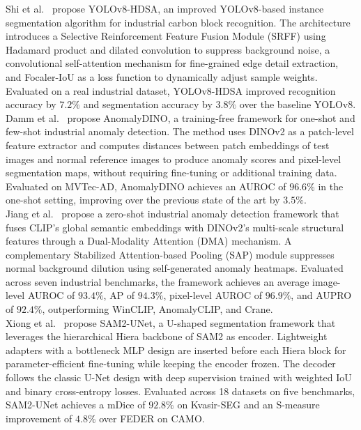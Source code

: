 \documentclass[11pt]{article}
\begin{document}
Shi et al.~\cite{Shi2025CarbonBlock} propose YOLOv8-HDSA, an improved
YOLOv8-based instance segmentation algorithm for industrial carbon block
recognition. The architecture introduces a Selective Reinforcement Feature Fusion
Module (SRFF) using Hadamard product and dilated convolution to suppress
background noise, a convolutional self-attention mechanism for fine-grained edge
detail extraction, and Focaler-IoU as a loss function to dynamically adjust
sample weights. Evaluated on a real industrial dataset, YOLOv8-HDSA improved
recognition accuracy by $7.2\%$ and segmentation accuracy by $3.8\%$ over the
baseline YOLOv8.\\

Damm et al.~\cite{Damm2024AnomalyDINO} propose AnomalyDINO, a training-free
framework for one-shot and few-shot industrial anomaly detection. The method
uses DINOv2 as a patch-level feature extractor and computes distances between
patch embeddings of test images and normal reference images to produce anomaly
scores and pixel-level segmentation maps, without requiring fine-tuning or
additional training data. Evaluated on MVTec-AD, AnomalyDINO achieves an AUROC
of $96.6\%$ in the one-shot setting, improving over the previous state of the
art by $3.5\%$.\\

Jiang et al.~\cite{Jiang2025CLIPDINO} propose a zero-shot industrial anomaly
detection framework that fuses CLIP's global semantic embeddings with DINOv2's
multi-scale structural features through a Dual-Modality Attention (DMA) mechanism.
A complementary Stabilized Attention-based Pooling (SAP) module suppresses normal
background dilution using self-generated anomaly heatmaps. Evaluated across seven
industrial benchmarks, the framework achieves an average image-level AUROC of
$93.4\%$, AP of $94.3\%$, pixel-level AUROC of $96.9\%$, and AUPRO of $92.4\%$,
outperforming WinCLIP, AnomalyCLIP, and Crane.\\

Xiong et al.~\cite{Xiong2026SAM2UNet} propose SAM2-UNet, a U-shaped segmentation
framework that leverages the hierarchical Hiera backbone of SAM2 as encoder.
Lightweight adapters with a bottleneck MLP design are inserted before each Hiera
block for parameter-efficient fine-tuning while keeping the encoder frozen. The
decoder follows the classic U-Net design with deep supervision trained with
weighted IoU and binary cross-entropy losses. Evaluated across 18 datasets on five
benchmarks, SAM2-UNet achieves a mDice of $92.8\%$ on Kvasir-SEG and an
S-measure improvement of $4.8\%$ over FEDER on CAMO.\\
\end{document}
